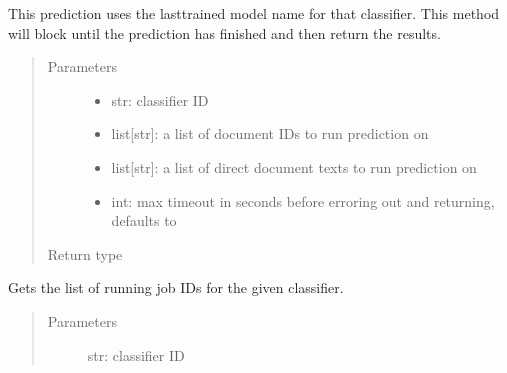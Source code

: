 \documentclass[letterpaper,10pt,english]{sphinxmanual}
\begin{document}
\begin{fulllineitems}
\begin{fulllineitems}
\sphinxAtStartPar
This prediction uses the last\sphinxhyphen{}trained model name for that classifier.  This method will
block until the prediction has finished and then return the results.
\begin{quote}\begin{description}
\item[{Parameters}] \leavevmode\begin{itemize}
\item {} 
\sphinxAtStartPar
{} \textendash{} str: classifier ID

\item {} 
\sphinxAtStartPar
{} \textendash{} list{[}str{]}: a list of document IDs to run prediction on

\item {} 
\sphinxAtStartPar
{} \textendash{} list{[}str{]}: a list of direct document texts to run prediction on

\item {} 
\sphinxAtStartPar
{} \textendash{} int: max timeout in seconds before erroring out and returning, defaults
to 

\end{itemize}

\item[{Return type}] \leavevmode
\sphinxAtStartPar
{}

\end{description}\end{quote}

\end{fulllineitems}


\begin{fulllineitems}
\label{\detokenize{autoapi/pine/client/index:pine.client.PineClient.get_classifier_running_jobs}}
\sphinxAtStartPar
Gets the list of running job IDs for the given classifier.
\begin{quote}\begin{description}
\item[{Parameters}] \leavevmode
\sphinxAtStartPar
{} \textendash{} str: classifier ID


\end{description}
\end{quote}
\end{fulllineitems}
\end{fulllineitems}
\end{document}
